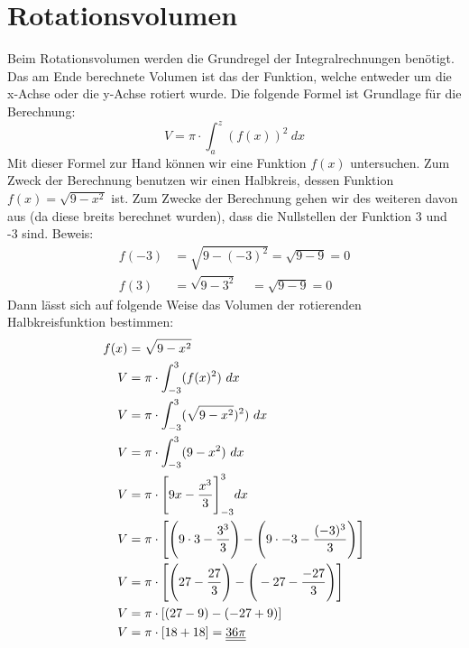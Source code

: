 \documentclass[a4paper,12pt]{article}
\begin{document}
\section{Rotationsvolumen}
Beim Rotationsvolumen werden die Grundregel der Integralrechnungen benötigt. Das am Ende berechnete Volumen ist das der Funktion, welche entweder um die x-Achse oder die y-Achse rotiert wurde.
Die folgende Formel ist Grundlage für die Berechnung:
$$V = \pi \cdot \int_{a}^z (f(x))^2\ dx$$
Mit dieser Formel zur Hand können wir eine Funktion $f(x)$ untersuchen.
Zum Zweck der Berechnung benutzen wir einen Halbkreis, dessen Funktion $f(x) = \sqrt{9 - x^2}$ ist.
Zum Zwecke der Berechnung gehen wir des weiteren davon aus (da diese breits berechnet wurden), dass die Nullstellen der Funktion 3 und -3 sind.
Beweis: 
\begin{equation*}
\begin{split}
f(-3) & = \sqrt{9- (-3)^2} = \sqrt{9 - 9} = 0 \\
f(3) & = \sqrt{9- 3^2}\ \ \ \ \ = \sqrt{9 - 9} = 0
\end{split}    
\end{equation*}
Dann lässt sich auf folgende Weise das Volumen der rotierenden Halbkreisfunktion bestimmen:
\begin{equation*}
\begin{split}
f(x) & = \sqrt{9 - x^2}\\
V & = \pi \cdot \int_{-3}^3 (f(x)^2)\ dx\\
V & = \pi \cdot \int_{-3}^3 (\sqrt{9 - x^2})^2)\ dx\\
V & = \pi \cdot \int_{-3}^3 (9 - x^2)\ dx\\
V & = \pi \cdot \Bigg{[}9x - \frac{x^3}{3}\Bigg{]}_{-3}^{3} dx\\
V & = \pi \cdot \Bigg{[}\Bigg{(}9 \cdot 3 - \frac{3^3}{3}\Bigg{)} - \Bigg{(}9 \cdot -3 - \frac{(-3)^3}{3}\Bigg{)}\Bigg{]}\\
V & = \pi \cdot \Bigg{[}\Bigg{(} 27 - \frac{27}{3} \Bigg{)} - \Bigg{(} -27 - \frac{-27}{3} \Bigg{)}\Bigg{]}\\
V & = \pi \cdot [(27 - 9) - (-27 + 9)]\\
V & = \pi \cdot [18 + 18] = \underline{\underline{36\pi}}
\end{split}    
\end{equation*}
\pagebreak
\end{document}
